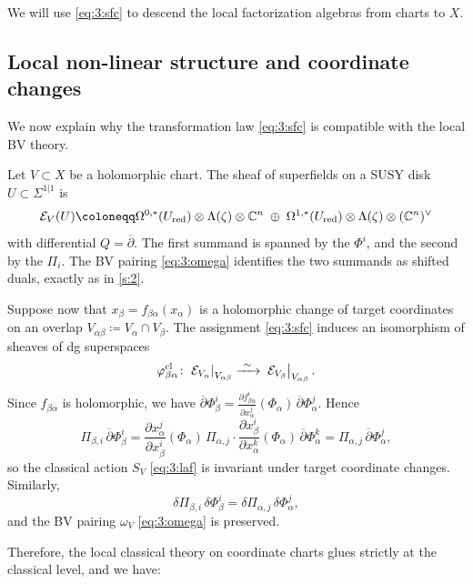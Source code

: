 \documentclass[final,reqno]{amsart}
\numberwithin{equation}{section}
\theoremstyle{definition}
\newcommand{\ceq}{\coloneqq} %
\newcommand{\xrr}[1]{\xrightarrow{\ #1 \ }{}}
\newcommand{\lsto}{\xrr{\sim}}
\newcommand{\tcl}{\textup{cl}}
\newcommand{\tred}{\textup{red}}
\newcommand{\bbC}{\mathbb{C}}
\newcommand{\clE}{\mathcal{E}}
\newcommand{\pd}{\partial}
\newcommand{\bpd}{\overline{\partial}}
\newcommand{\sSig}{\Sigma^{1|1}}
\newcommand{\rst}[2]{\left. #1 \right|_{#2}}
\begin{document}
We will use \eqref{eq:3:sfc} to 
descend the local factorization algebras from charts to $X$.


\subsection{Local non-linear structure and coordinate changes}\label{ss:3.2}

We now explain why the transformation law \eqref{eq:3:sfc} 
is compatible with the local BV theory.

Let $V \subset X$ be a holomorphic chart. 
The sheaf of superfields on a SUSY disk $U \subset \sSig$ is
\begin{align*}
 \clE_V(U) \ceq
 \Omega^{0,*}(U_{\tred}) \otimes \Lambda(\zeta) \otimes  \bbC^n \;\oplus\;
 \Omega^{1,*}(U_{\tred}) \otimes \Lambda(\zeta) \otimes (\bbC^n)^\vee
\end{align*}
with differential $Q=\bpd$. 
The first summand is spanned by the $\Phi^i$, 
and the second by the $\Pi_i$. 
The BV pairing \eqref{eq:3:omega} identifies 
the two summands as shifted duals, exactly as in \cref{s:2}.

Suppose now that $x_\beta=f_{\beta\alpha}(x_\alpha)$ is a holomorphic change of
target coordinates on an overlap $V_{\alpha\beta} \ceq V_\alpha \cap V_\beta$.
The assignment \eqref{eq:3:sfc} induces an isomorphism of sheaves of dg superspaces
\begin{align}\label{eq:3:fiso}
 \varphi^{\tcl}_{\beta\alpha}\colon 
 \rst{\clE_{V_\alpha}}{V_{\alpha\beta}} \lsto
 \rst{\clE_{V_\beta }}{V_{\alpha\beta}}.
\end{align}
Since $f_{\beta\alpha}$ is holomorphic, we have
$\bpd \Phi^i_\beta = 
 \frac{\pd f^i_{\beta\alpha}}{\pd x^{j}_\alpha}(\Phi_\alpha)\,
 \bpd \Phi^{j}_\alpha$.
Hence
\[
 \Pi_{\beta,i}\,\bpd \Phi^i_\beta =
 \frac{\pd x^j_\alpha}{\pd x^i_\beta }(\Phi_\alpha) \, \Pi_{\alpha,j} \cdot
 \frac{\pd x^i_\beta }{\pd x^k_\alpha}(\Phi_\alpha) \, \bpd \Phi^k_\alpha =
 \Pi_{\alpha,j} \, \bpd \Phi^j_\alpha,
\]
so the classical action $S_V$ \eqref{eq:3:laf} is invariant 
under target coordinate changes. Similarly,
\[
 \delta \Pi_{\beta, i} \, \delta \Phi^i_\beta  =
 \delta \Pi_{\alpha,j} \, \delta \Phi^j_\alpha, 
\]
and the BV pairing $\omega_V$ \eqref{eq:3:omega} is preserved.

Therefore, the local classical theory on coordinate charts 
glues strictly at the classical level, and we have:
\end{document}

